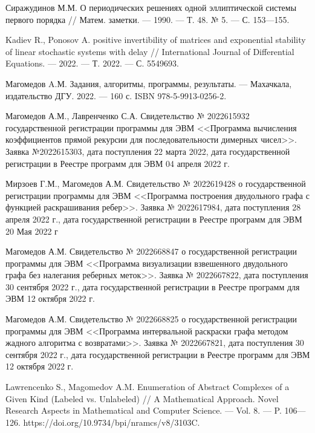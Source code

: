 \begin{thebibliography}{99}
  


Сиражудинов М.М. О периодических решениях одной
  	эллиптической системы первого порядка //  Матем. заметки.
  	--- 1990.  --- Т. 48. № 5. --- С. 153---155.




Kadiev R., Ponosov A. positive invertibility of matrices and
exponential stability of linear stochastic systems with delay
//
International Journal of Differential Equations.
--- 2022.
--- Т. 2022.
--- С. 5549693.




Магомедов A.М.
Задания, алгоритмы, программы, результаты.
--- Махачкала, издательство ДГУ. 2022.
--- 160 с.
ISBN 978-5-9913-0256-2.




Магомедов А.М., Лавренченко С.А.
Свидетельство № 2022615932 государственной регистрации программы для ЭВМ <<Программа вычисления коэффициентов прямой рекурсии для последовательности димерных чисел>>. Заявка №2022615303, дата поступления 22 марта 2022, дата государственной регистрации в Реестре программ для ЭВМ 04 апреля 2022 г.




Мирзоев Г.М., Магомедов А.М.
Свидетельство № 2022619428 о государственной регистрации программы для ЭВМ <<Программа построения двудольного графа с функцией раскрашивания ребер>>. Заявка № 2022617984, дата поступления 28 апреля 2022 г., дата государственной регистрации в Реестре программ для ЭВМ 20 Мая 2022 г




Магомедов А.М.
Свидетельство № 2022668847 о государственной регистрации программы для ЭВМ <<Программа визуализации взвешенного двудольного графа без налегания реберных меток>>. Заявка № 2022667822, дата поступления 30 сентября 2022 г., дата государственной регистрации в Реестре программ для ЭВМ 12 октября 2022 г.




Магомедов А.М.
Свидетельство № 2022668825 о государственной регистрации программы для ЭВМ <<Программа интервальной раскраски графа методом жадного алгоритма с возвратами>>.
Заявка № 2022667821, дата поступления 30 сентября 2022 г., дата государственной регистрации в Реестре программ для ЭВМ 12 октября 2022 г.




Lawrencenko S., Magomedov A.M.
Enumeration of Abstract Complexes of a Given Kind (Labeled vs. Unlabeled)
//
A Mathematical Approach. Novel Research Aspects in Mathematical and Computer Science.
--- Vol. 8.
--- P. 106---126.
https://doi.org/10.9734/bpi/nramcs/v8/3103C.





\end{thebibliography}
